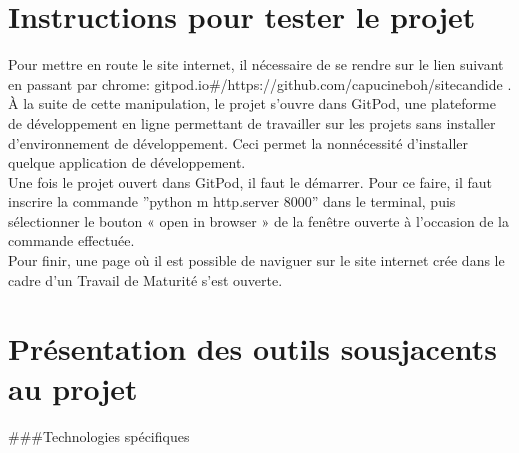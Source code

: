 \documentclass[a4,10pt,french]{sphinxmanual}
\begin{document}
\section{Instructions pour tester le projet}
\label{\detokenize{chapitre-02:instructions-pour-tester-le-projet}}
\sphinxAtStartPar
Pour mettre en route le site internet, il nécessaire de se rendre sur le lien suivant en passant par chrome: gitpod.io\#/https://github.com/capucineboh/site\sphinxhyphen{}candide .\\
À la suite de cette manipulation, le projet s’ouvre dans GitPod, une plateforme de développement en ligne permettant de travailler sur les projets sans installer d’environnement de développement. Ceci permet la non\sphinxhyphen{}nécessité d’installer quelque application de développement.\\
Une fois le projet ouvert dans GitPod, il faut le démarrer. Pour ce faire, il faut inscrire la commande ”python \sphinxhyphen{}m http.server 8000” dans le terminal, puis sélectionner le bouton « open in browser » de la fenêtre ouverte à l’occasion de la commande effectuée.\\
Pour finir, une page où il est possible de naviguer sur le site internet crée dans le cadre d’un Travail de Maturité s’est ouverte.


\section{Présentation des outils sous\sphinxhyphen{}jacents au projet}
\label{\detokenize{chapitre-02:presentation-des-outils-sous-jacents-au-projet}}
\sphinxAtStartPar
\#\#\#Technologies spécifiques
\end{document}
